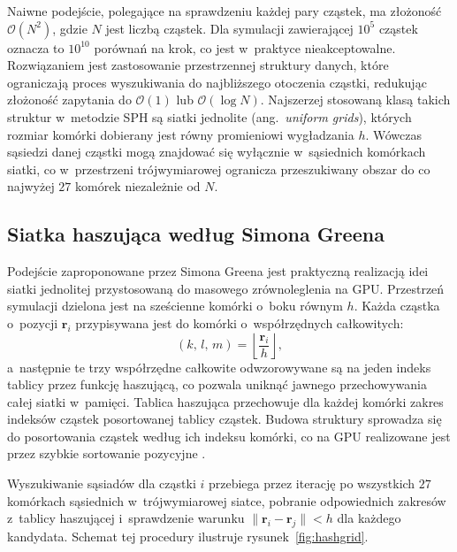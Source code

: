 Naiwne podejście, polegające na sprawdzeniu każdej pary cząstek, ma złożoność
$\mathcal{O}(N^2)$, gdzie $N$ jest liczbą cząstek. Dla symulacji zawierającej
$10^5$ cząstek oznacza to $10^{10}$ porównań na krok, co jest w~praktyce
nieakceptowalne. Rozwiązaniem jest zastosowanie przestrzennej struktury danych,
które ograniczają proces wyszukiwania do najbliższego otoczenia cząstki, 
redukując złożoność zapytania do $\mathcal{O}(1)$ lub $\mathcal{O}(\log N)$.
Najszerzej stosowaną klasą takich struktur w~metodzie SPH są siatki jednolite
(ang.~\textit{uniform grids}), których rozmiar komórki dobierany jest równy
promieniowi wygładzania $h$. Wówczas sąsiedzi danej cząstki mogą znajdować
się wyłącznie w~sąsiednich komórkach siatki, co w~przestrzeni trójwymiarowej
ogranicza przeszukiwany obszar do co najwyżej $27$ komórek niezależnie od $N$.

\subsection{Siatka haszująca według Simona Greena}

Podejście zaproponowane przez Simona Greena \cite{green2010particle} jest
praktyczną realizacją idei siatki jednolitej przystosowaną do masowego
zrównoleglenia na GPU. Przestrzeń symulacji dzielona jest na sześcienne komórki
o~boku równym $h$. Każda cząstka o~pozycji $\mathbf{r}_i$ przypisywana jest
do komórki o~współrzędnych całkowitych:
\begin{equation}
    (k,\,l,\,m) = \left\lfloor \frac{\mathbf{r}_i}{h} \right\rfloor,
\end{equation}
a~następnie te trzy współrzędne całkowite odwzorowywane są na jeden indeks tablicy
przez funkcję haszującą, co pozwala uniknąć jawnego przechowywania całej siatki
w~pamięci. Tablica haszująca przechowuje dla każdej komórki zakres indeksów
cząstek posortowanej tablicy cząstek. Budowa struktury sprowadza się do
posortowania cząstek według ich indeksu komórki, co na GPU realizowane jest
przez szybkie sortowanie pozycyjne \cite{green2010particle}.

Wyszukiwanie sąsiadów dla cząstki $i$ przebiega przez iterację po wszystkich
$27$ komórkach sąsiednich w~trójwymiarowej siatce, pobranie odpowiednich zakresów
z~tablicy haszującej i~sprawdzenie warunku $\|\mathbf{r}_i - \mathbf{r}_j\| < h$
dla każdego kandydata. Schemat tej procedury ilustruje rysunek~\ref{fig:hashgrid}.

